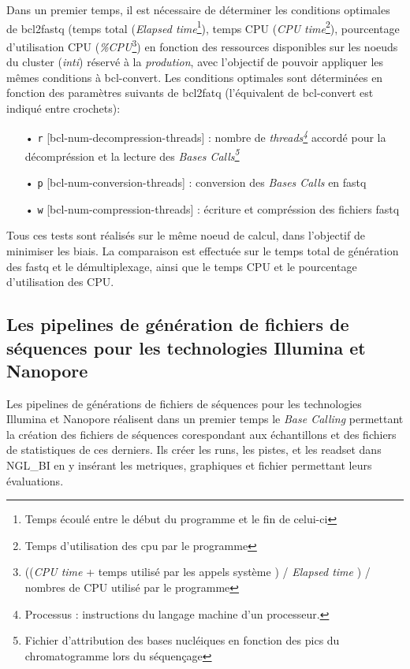 Dans un premier temps, il est nécessaire de déterminer les conditions optimales de bcl2fastq (temps total (\emph{Elapsed time}\footnote{Temps écoulé entre le début du programme et le fin de celui-ci}), temps CPU (\emph{CPU time}\footnote{Temps d'utilisation des cpu par le programme}), pourcentage d'utilisation CPU (\emph{\%CPU}\footnote{((\emph{CPU time} + temps utilisé par les appels système ) / \emph{Elapsed time} ) / nombres de CPU utilisé par le programme}) en fonction des ressources disponibles sur les noeuds du cluster (\emph{inti}) réservé à la \emph{prodution}, avec l'objectif de pouvoir appliquer les mêmes conditions à bcl-convert. Les conditions optimales sont déterminées en fonction des paramètres suivants de bcl2fatq (l'équivalent de bcl-convert est indiqué entre crochets): \\
\begin{itemize}
    \item[•] \texttt{r} [bcl-num-decompression-threads] : nombre de \emph{threads\footnote{Processus : instructions du langage machine d'un processeur.}} accordé pour la décompréssion et la lecture des \emph{Bases Calls\footnote{Fichier d'attribution des bases nucléiques en fonction des pics du chromatogramme lors du séquençage}}
    \item[•] \texttt{p} [bcl-num-conversion-threads] : conversion des \emph{Bases Calls} en fastq
    \item[•] \texttt{w} [bcl-num-compression-threads] : écriture et compréssion des fichiers fastq\\
\end{itemize}

Tous ces tests sont réalisés sur le même noeud de calcul, dans l'objectif de minimiser les biais. La comparaison est effectuée sur le temps total de génération des fastq et le démultiplexage, ainsi que le temps CPU et le pourcentage d'utilisation des CPU.

\subsection{Les pipelines de génération de fichiers de séquences pour les technologies Illumina et Nanopore}
Les pipelines de générations de fichiers de séquences pour les technologies Illumina et Nanopore réalisent dans un premier temps le \emph{Base Calling} permettant la création des fichiers de séquences corespondant aux échantillons et des fichiers de statistiques de ces derniers. Ils créer les runs, les pistes, et les readset dans NGL\_BI en y insérant les metriques, graphiques et fichier permettant leurs évaluations.\\


